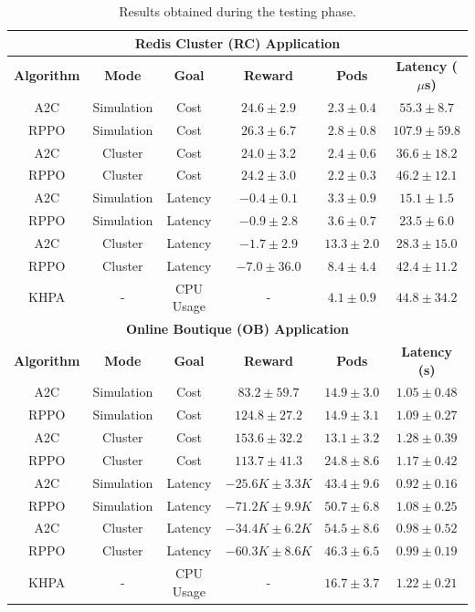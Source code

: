 \documentclass[conference]{IEEEtran}
\begin{document}
\begin{table}[h]
    \centering
    \caption{Results obtained during the testing phase.}
    \label{tab:testing-results}
    \begin{tabular}{|c|c|c|c|c|c|}
        \hline
        \multicolumn{6}{|c|}{\textbf{Redis Cluster (RC) Application}} \\
        \hline
        \textbf{Algorithm} & \textbf{Mode} & \textbf{Goal} & \textbf{Reward} & \textbf{Pods} & \textbf{Latency ($\mu$s)} \\
        \hline
        A2C & Simulation & Cost & $24.6 \pm 2.9$ & $2.3 \pm 0.4$ & $55.3 \pm 8.7$ \\
        RPPO & Simulation & Cost & $26.3 \pm 6.7$ & $2.8 \pm 0.8$ & $107.9 \pm 59.8$ \\
        A2C & Cluster & Cost & $24.0 \pm 3.2$ & $2.4 \pm 0.6$ & $36.6 \pm 18.2$ \\
        RPPO & Cluster & Cost & $24.2 \pm 3.0$ & $2.2 \pm 0.3$ & $46.2 \pm 12.1$ \\
        A2C & Simulation & Latency & $-0.4 \pm 0.1$ & $3.3 \pm 0.9$ & $15.1 \pm 1.5$ \\
        RPPO & Simulation & Latency & $-0.9 \pm 2.8$ & $3.6 \pm 0.7$ & $23.5 \pm 6.0$ \\
        A2C & Cluster & Latency & $-1.7 \pm 2.9$ & $13.3 \pm 2.0$ & $28.3 \pm 15.0$ \\
        RPPO & Cluster & Latency & $-7.0 \pm 36.0$ & $8.4 \pm 4.4$ & $42.4 \pm 11.2$ \\
        \hline
        KHPA & - & CPU Usage & - & $4.1 \pm 0.9$ & $44.8 \pm 34.2$ \\
        \hline
        \multicolumn{6}{|c|}{\textbf{Online Boutique (OB) Application}} \\
        \hline
        \textbf{Algorithm} & \textbf{Mode} & \textbf{Goal} & \textbf{Reward} & \textbf{Pods} & \textbf{Latency (s)} \\
        \hline
        A2C & Simulation & Cost & $83.2 \pm 59.7$ & $14.9 \pm 3.0$ & $1.05 \pm 0.48$ \\
        RPPO & Simulation & Cost & $124.8 \pm 27.2$ & $14.9 \pm 3.1$ & $1.09 \pm 0.27$ \\
        A2C & Cluster & Cost & $153.6 \pm 32.2$ & $13.1 \pm 3.2$ & $1.28 \pm 0.39$ \\
        RPPO & Cluster & Cost & $113.7 \pm 41.3$ & $24.8 \pm 8.6$ & $1.17 \pm 0.42$ \\
        A2C & Simulation & Latency & $-25.6K \pm 3.3K$ & $43.4 \pm 9.6$ & $0.92 \pm 0.16$ \\
        RPPO & Simulation & Latency & $-71.2K \pm 9.9K$ & $50.7 \pm 6.8$ & $1.08 \pm 0.25$ \\
        A2C & Cluster & Latency & $-34.4K \pm 6.2K$ & $54.5 \pm 8.6$ & $0.98 \pm 0.52$ \\
        RPPO & Cluster & Latency & $-60.3K \pm 8.6K$ & $46.3 \pm 6.5$ & $0.99 \pm 0.19$ \\
        \hline
        KHPA & - & CPU Usage & - & $16.7 \pm 3.7$ & $1.22 \pm 0.21$ \\
        \hline
    \end{tabular}
\end{table}
\end{document}
